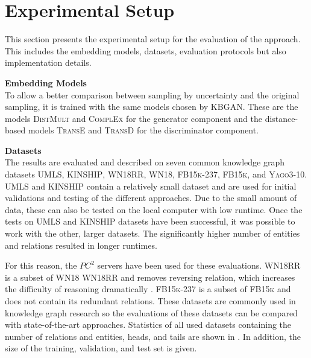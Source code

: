\section{Experimental Setup}
\label{ch:evaluation:sec:experimental_setup}
%
This section presents the experimental setup for the evaluation of the \usgan approach.
This includes the embedding models, datasets, evaluation protocols but also implementation details.

\textbf{Embedding Models}\\
To allow a better comparison between sampling by uncertainty and the original sampling, it is trained with the same models chosen by \textsc{KBGAN}.
These are the models \textsc{DistMult} and \textsc{ComplEx} for the generator component and the distance-based models \textsc{TransE} and \textsc{TransD} for the discriminator component.

\textbf{Datasets}\\
The results are evaluated and described on seven common knowledge graph datasets  \textsc{UMLS}, \textsc{KINSHIP}, \textsc{WN18RR}, \textsc{WN18}, \textsc{FB15k-237}, \textsc{FB15k}, and \textsc{Yago3-10}.
\textsc{UMLS} and \textsc{KINSHIP} contain a relatively small dataset and are used for initial validations and testing of the different approaches.
Due to the small amount of data, these can also be tested on the local computer with low runtime.
Once the tests on \textsc{UMLS} and \textsc{KINSHIP} datasets have been successful, it was possible to work with the other, larger datasets.
The significantly higher number of entities and relations resulted in longer runtimes.

For this reason, the $PC^2$ servers have been used for these evaluations.
\textsc{WN18RR} is a subset of \textsc{WN18} \textsc{WN18RR} and removes reversing relation, which increases the difficulty of reasoning dramatically \cite{cai2017kbgan}.
\textsc{FB15k-237} is a subset of \textsc{FB15k} and does not contain its redundant relations.
These datasets are commonly used in knowledge graph research so the evaluations of these datasets can be compared with state-of-the-art approaches.
Statistics of all used datasets containing the number of relations and entities, heads, and tails are shown in . 
In addition, the size of the training, validation, and test set is given.
        

